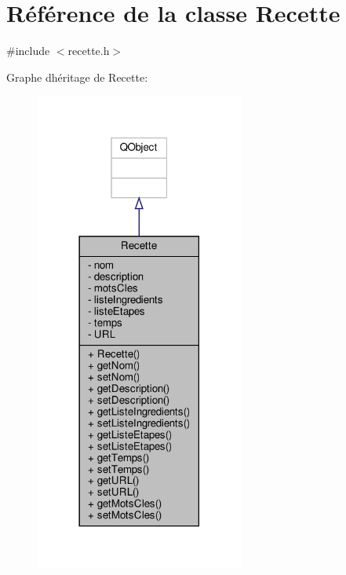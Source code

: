 \hypertarget{classRecette}{}\section{Référence de la classe Recette}
\label{classRecette}


{\ttfamily \#include $<$recette.\+h$>$}



Graphe d\textquotesingle{}héritage de Recette\+:\nopagebreak
\begin{figure}[H]
\begin{center}
\leavevmode
\includegraphics[width=194pt]{classRecette__inherit__graph}
\end{center}
\end{figure}


